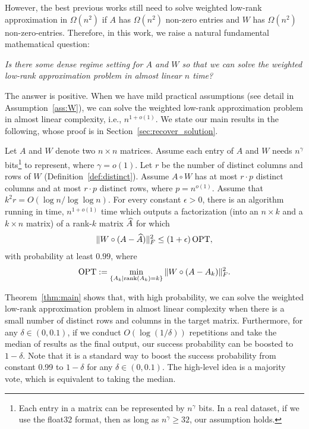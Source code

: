 However, the best previous works still need to solve weighted low-rank approximation in $\Omega(n^2)$ if $A$ has $\Omega(n^2)$ non-zero entries and $W$ has $\Omega(n^2)$ non-zero-entries. 
Therefore, in this work, we raise a natural fundamental mathematical question:
\begin{center}
{\it
Is there some dense regime setting for $A$ and $W$ so that we can solve the weighted low-rank approximation problem in almost linear $n$ time?
}
\end{center}

The answer is positive. 
When we have mild practical assumptions (see detail in Assumption~\ref{ass:W}), we can solve the weighted low-rank approximation problem in almost linear complexity, i.e., $n^{1+o(1)}$. We state our main results in the following, whose proof is in Section~\ref{sec:recover_solution}.


\begin{theorem} \label{thm:main}
Let  $A$ and $ W$ denote two $n \times n$ matrices. 
Assume each entry of $A$ and $W$ needs $n^{\gamma}$ bits\footnote{Each entry in a matrix can be represented by $n^\gamma$ bits. In a real dataset, if we use the float32 format, then as long as $n^\gamma \ge 32$, our assumption holds.} to represent, where $\gamma = o(1)$.
Let $r$ be the number of distinct columns and rows of $W$ (Definition~\ref{def:distinct}).  
Assume $A \circ W$ has at most $r \cdot p$ distinct columns and at most $r \cdot p$ distinct rows, where $p = n^{o(1)}$. 
Assume that $k^2r= O(\log n / \log \log n)$. For every constant $\epsilon>0$, there is an algorithm running in time,   
$n^{1+o(1)}$ time which outputs a factorization (into an $n \times k$ and a $k \times n$ matrix) of a rank-$k$ matrix $\widehat{A}$ for which  
\begin{align*}
\|W \circ(A-\widehat{A})\|_{F}^{2} \leq(1+\epsilon) \operatorname{OPT},
\end{align*}
with probability at least $0.99$, where 
\begin{align*}
    \operatorname{OPT}:= \min_{\{A_k| \mathrm{rank}(A_k)=k \}} \| W \circ ( A - A_k ) \|_F^2.
\end{align*}
\end{theorem}

Theorem~\ref{thm:main} shows that, with high probability, we can solve the weighted low-rank approximation problem in almost linear complexity when there is a small number of distinct rows and columns in the target matrix. Furthermore,  for any $\delta \in (0,0.1)$, if we conduct $O(\log(1/\delta))$ repetitions and take the median of results as the final output, our success probability can be boosted to $1-\delta$. Note that it is a standard way to boost the success probability from constant 0.99 to $1-\delta$ for any $\delta \in (0,0.1)$. The high-level idea is a majority vote, which is equivalent to taking the median. 


